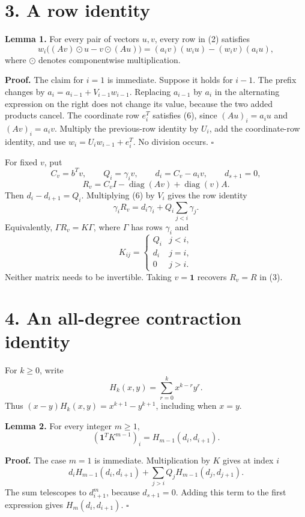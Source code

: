 \documentclass[
  11pt,
  a4paper,
]{scrartcl}
\begin{document}
\section{3. A row identity}\label{a-row-identity}

\textbf{Lemma 1.} For every pair of vectors \(u,v\), every row in (2)
satisfies \[
w_i\bigl((Av)\odot u-v\odot(Au)\bigr)
=(a_iv)(w_iu)-(w_iv)(a_iu),
\tag{6}
\] where \(\odot\) denotes componentwise multiplication.

\textbf{Proof.} The claim for \(i=1\) is immediate. Suppose it holds for
\(i-1\). The prefix changes by \(a_i=a_{i-1}+V_{i-1}w_{i-1}\). Replacing
\(a_{i-1}\) by \(a_i\) in the alternating expression on the right does
not change its value, because the two added products cancel. The
coordinate row \(e_i^T\) satisfies (6), since \((Au)_i=a_iu\) and
\((Av)_i=a_iv\). Multiply the previous-row identity by \(U_i\), add the
coordinate-row identity, and use \(w_i=U_iw_{i-1}+e_i^T\). No division
occurs. \(\square\)

For fixed \(v\), put \[
C_v=b^Tv,\qquad Q_i=\gamma_iv,\qquad
 d_i=C_v-a_iv,\qquad d_{s+1}=0,
\] \[
R_v=C_vI-\operatorname{diag}(Av)+\operatorname{diag}(v)A.
\tag{7}
\] Then \(d_i-d_{i+1}=Q_i\). Multiplying (6) by \(V_i\) gives the row
identity \[
\gamma_iR_v=d_i\gamma_i+Q_i\sum_{j<i}\gamma_j.
\tag{8}
\] Equivalently, \(\Gamma R_v=K\Gamma\), where \(\Gamma\) has rows
\(\gamma_i\) and \[
K_{ij}=\begin{cases}Q_i&j<i,\\d_i&j=i,\\0&j>i.\end{cases}
\tag{9}
\] Neither matrix needs to be invertible. Taking \(v=\mathbf1\) recovers
\(R_v=R\) in (3).

\section{4. An all-degree contraction
identity}\label{an-all-degree-contraction-identity}

For \(k\geq0\), write \[
H_k(x,y)=\sum_{r=0}^k x^{k-r}y^r.
\] Thus \((x-y)H_k(x,y)=x^{k+1}-y^{k+1}\), including when \(x=y\).

\textbf{Lemma 2.} For every integer \(m\geq1\), \[
(\mathbf1^TK^{m-1})_i=H_{m-1}(d_i,d_{i+1}).
\tag{10}
\]

\textbf{Proof.} The case \(m=1\) is immediate. Multiplication by \(K\)
gives at index \(i\) \[
d_iH_{m-1}(d_i,d_{i+1})+
\sum_{j>i}Q_jH_{m-1}(d_j,d_{j+1}).
\] The sum telescopes to \(d_{i+1}^{m}\), because \(d_{s+1}=0\). Adding
this term to the first expression gives \(H_m(d_i,d_{i+1})\).
\(\square\)
\end{document}
